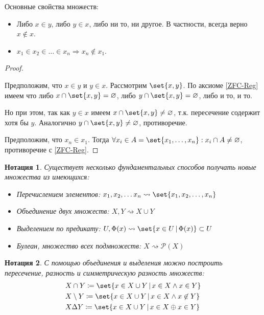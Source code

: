 \documentclass{article}
\newtheorem*{defnotation}{Нотация}
\newcommand{\lxor}{\oplus}
\newcommand{\setdiff}{\Delta}
\newcommand{\powerset}{\mathcal{P}}
\begin{document}
    \begin{remark}
        \label{rem:sets-properties}
        Основные свойства множеств:
        \begin{itemize}
            \item Либо \(x \in y\), либо \(y \in x\), либо ни то, ни другое. В частности, всегда верно \(x \not\in x\). 
            \item \(x_1 \in x_2 \in \ldots \in x_n \Rightarrow x_n \not\in x_1\).
        \end{itemize}
    \end{remark}
    \begin{proof} \ 

         Предположим, что \(x \in y\) и \(y \in x\). Рассмотрим \(\set{x, y}\). По аксиоме \ref{ZFC-Reg} имеем что либо \(x \cap \set{x, y} = \varnothing\), либо \(y \cap \set{x, y} = \varnothing\), либо и то, и то.
        
        Но при этом, так как \(y \in x\) имеем \(x \cap \set{x, y} \ne \varnothing\), т.к. пересечение содержит хотя бы \(y\). Аналогично \(y \cap \set{x, y} \ne \varnothing\), противоречие. 
        
         Предположим, что \(x_n \in x_1\). Тогда \(\forall x_i \in A = \set{x_1, \ldots, x_n}: x_i \cap A \ne \varnothing\), противоречие с \ref{ZFC-Reg}.
    \end{proof}
    \begin{defnotation}
        Существует несколько фундаментальных способов получать новые множества из имеющихся:
        \begin{itemize}
            \item Перечислением элементов: \(x_1, x_2, \ldots x_n \rightsquigarrow \set{x_1, x_2, \ldots, x_n}\)
            \item Объединение двух множеств: \(X, Y \rightsquigarrow X \cup Y\)
            \item Выделением по предикату: \(U, \Phi(x) \rightsquigarrow \set{x \in U \,|\, \Phi(x)} \subset U\)
            \item Булеан, множество всех подмножеств: \(X \rightsquigarrow \powerset(X)\)
        \end{itemize}
    \end{defnotation}
    \begin{defnotation}
        С помощью объединения и выделения можно построить пересечение, разность и симметрическую разность множеств:
    \begin{align*}
        &X \cap Y \coloneq \set{x \in X \cup Y \,|\, x \in X \land x \in Y} \\
        &X \setminus Y \coloneq \set{x \in X \cup Y \,|\, x \in X \land x \not\in Y} \\
        &X \setdiff Y \coloneq \set{x \in X \cup Y \,|\, x \in X \lxor x \in Y}
    \end{align*}
    \end{defnotation}
\end{document}
